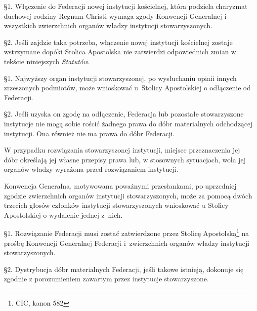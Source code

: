 

 \S{}1. Włączenie do Federacji nowej instytucji kościelnej, która podziela charyzmat duchowej rodziny Regnum Christi wymaga zgody Konwencji Generalnej i wszystkich zwierzchnich organów władzy instytucji stowarzyszonych.


\S{}2. Jeśli zajdzie taka potrzeba, włączenie nowej instytucji kościelnej zostaje wstrzymane dopóki Stolica Apostolska nie zatwierdzi odpowiednich zmian w tekście niniejszych {\em Statutów}.




\filbreak{}


 \S{}1. Najwyższy organ instytucji stowarzyszonej, po wysłuchaniu opinii innych zrzeszonych podmiotów, może wnioskować \mbox{u Stolicy} Apostolskiej o odłączenie od Federacji.


\S{}2. Jeśli uzyska on zgodę na odłączenie, Federacja lub pozostałe stowarzyszone instytucje nie mogą sobie rościć żadnego prawa do dóbr materialnych odchodzącej instytucji. Ona również nie ma prawa do dóbr Federacji.


 


 W przypadku rozwiązania stowarzyszonej instytucji, miejsce przeznaczenia jej dóbr określają jej własne przepisy prawa lub, w stosownych sytuacjach, wola jej organów władzy wyrażona przed rozwiązaniem instytucji.


 


 Konwencja Generalna, motywowana poważnymi przesłankami, po uprzedniej zgodzie zwierzchnich organów instytucji stowarzyszonych, może za pomocą dwóch trzecich głosów członków instytucji stowarzyszonych wnioskować u Stolicy Apostolskiej o wydalenie jednej \mbox{z nich}.


 


 \S{}1. Rozwiązanie Federacji musi zostać zatwierdzone przez Stolicę Apostolską\footnote{CIC, kanon 582} na prośbę Konwencji Generalnej Federacji \mbox{i zwierzchnich} organów władzy instytucji stowarzyszonych.


\S{}2. Dystrybucja dóbr materialnych Federacji, jeśli takowe istnieją, dokonuje się zgodnie z porozumieniem zawartym przez instytucje stowarzyszone.


